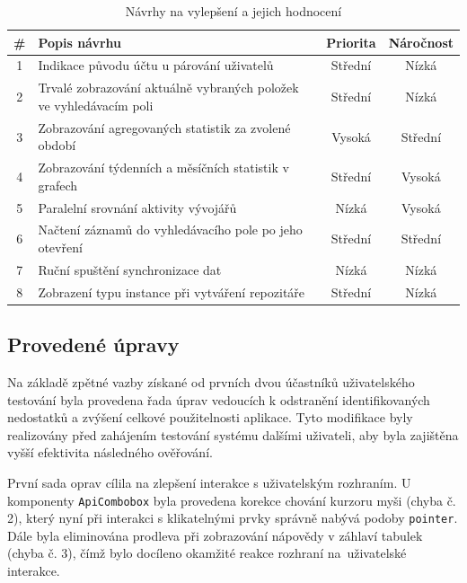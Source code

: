 \begin{table}[h]
    \centering
    \caption{Návrhy na vylepšení a jejich hodnocení}
    \label{table:testing-improvements}
    \begin{tabularx}{\textwidth}{|c|X|c|c|}
    \hline
    \# & Popis návrhu                                                       & Priorita & Náročnost \\ \hline\hline
    1  & Indikace původu účtu u párování uživatelů                          & Střední  & Nízká     \\ \hline
    2  & Trvalé zobrazování aktuálně vybraných položek ve vyhledávacím poli & Střední  & Nízká     \\ \hline
    3  & Zobrazování agregovaných statistik za zvolené období               & Vysoká   & Střední   \\ \hline
    4  & Zobrazování týdenních a měsíčních statistik v grafech              & Střední  & Vysoká    \\ \hline
    5  & Paralelní srovnání aktivity vývojářů                               & Nízká    & Vysoká    \\ \hline
    6  & Načtení záznamů do vyhledávacího pole po jeho otevření             & Střední  & Střední   \\ \hline
    7  & Ruční spuštění synchronizace dat                                   & Nízká    & Nízká     \\ \hline
    8  & Zobrazení typu instance při vytváření repozitáře                   & Střední  & Nízká     \\ \hline
    \end{tabularx}
\end{table}

\subsection{Provedené úpravy}
Na základě zpětné vazby získané od prvních dvou účastníků uživatelského testování byla provedena řada úprav vedoucích k odstranění identifikovaných nedostatků a zvýšení celkové použitelnosti aplikace. Tyto modifikace byly realizovány před zahájením testování systému dalšími uživateli, aby byla zajištěna vyšší efektivita následného ověřování.

První sada oprav cílila na zlepšení interakce s uživatelským rozhraním. U komponenty \texttt{ApiCombobox} byla provedena korekce chování kurzoru myši (chyba č. 2), který nyní při interakci s klikatelnými prvky správně nabývá podoby \texttt{pointer}. Dále byla eliminována prodleva při zobrazování nápovědy v záhlaví tabulek (chyba č. 3), čímž bylo docíleno okamžité reakce rozhraní na~uživatelské interakce.

